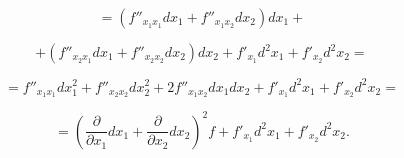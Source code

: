 {\[
= \left( f''_{x_1 x_1} dx_1 + f''_{x_1 x_2} dx_2 \right) dx_1 +
\]





\[
+ \left( f''_{x_2 x_1} dx_1 + f''_{x_2 x_2} dx_2 \right) dx_2 + f'_{x_1} d^2 x_1 + f'_{x_2} d^2 x_2 =
\]





\[
= f''_{x_1 x_1} dx_1^2 + f''_{x_2 x_2} dx_2^2 + 2 f''_{x_1 x_2} dx_1 dx_2 + f'_{x_1} d^2 x_1 + f'_{x_2} d^2 x_2 =
\]





\[
= \left( \frac{\partial}{\partial x_1} dx_1 + \frac{\partial}{\partial x_2} dx_2 \right)^2 f + f'_{x_1} d^2 x_1 + f'_{x_2} d^2 x_2.
\]




}